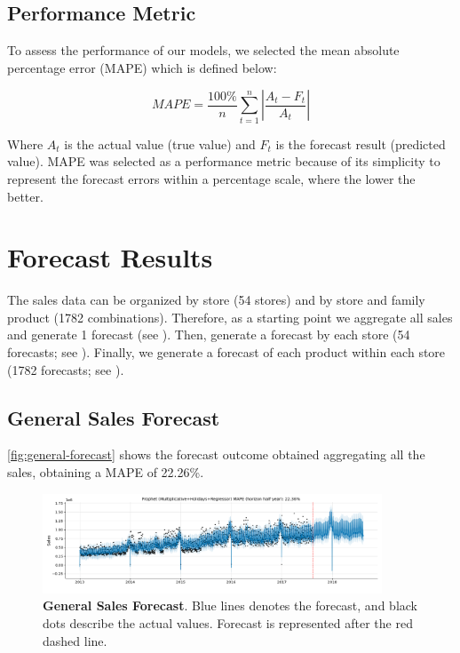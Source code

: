 \subsection[Performance Metric]{Performance Metric}
\label{sec:error}

To assess the performance of our models, we selected the mean absolute percentage error (MAPE) which is defined below:

\[ MAPE= \frac{100\%}{n} \sum_{t=1}^n \left| \frac{A_t - F_t}{A_t} \right|  \]

Where $A_t$ is the actual value (true value) and $F_t$ is the forecast result (predicted value). MAPE was selected as a performance metric because of its simplicity to represent the forecast errors within a percentage scale, where the lower the better. 

\clearpage

\section[Forecast Results]{Forecast Results}
\label{sec:results}

The sales data can be organized by store (54 stores) and by store and family product (1782 combinations). Therefore, as a starting point we aggregate all sales and generate 1 forecast (see ). Then, generate a forecast by each store (54 forecasts; see ). Finally, we generate a forecast of each product within each store (1782 forecasts; see ).

\subsection[General Sales Forecast]{General Sales Forecast}
\label{sec:general}

\autoref{fig:general-forecast} shows the forecast outcome obtained aggregating all the sales, obtaining a MAPE of 22.26\%. 

\begin{figure}[!htb]
  \centering
  \includegraphics[width=0.9\textwidth]{plots/forecast/forecast_prophet.png}
  \caption[General Sales Forecast]{\textbf{General Sales Forecast}. Blue lines denotes the forecast, and black dots describe the actual values. Forecast is represented after the red dashed line. }
  \label{fig:general-forecast}
\end{figure}

